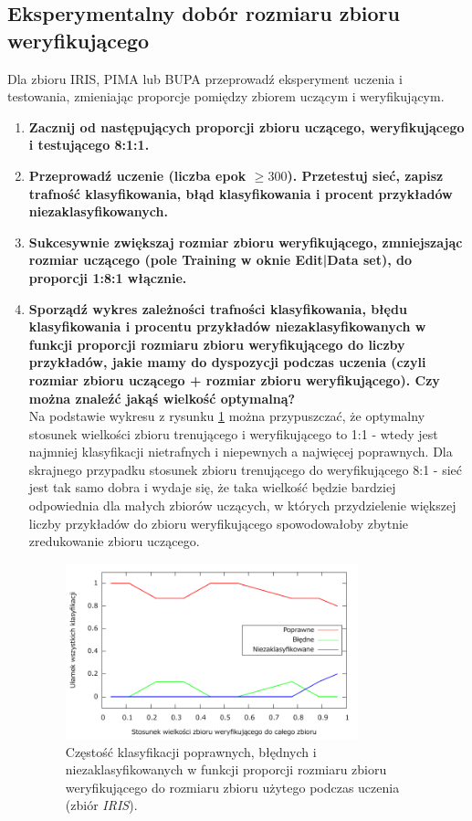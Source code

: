 \subsection{ Eksperymentalny dobór rozmiaru zbioru weryfikującego}
Dla zbioru IRIS, PIMA lub BUPA przeprowadź eksperyment uczenia i testowania, zmieniając proporcje pomiędzy zbiorem uczącym i weryfikującym.
\begin{enumerate}
\item \textbf{Zacznij od następujących proporcji zbioru uczącego, weryfikującego i testującego 8:1:1.}

\item \textbf{
Przeprowadź uczenie (liczba epok $ \geq 300 $). Przetestuj sieć, zapisz trafność klasyfikowania, błąd klasyfikowania i procent przykładów niezaklasyfikowanych.}

\item \textbf{
Sukcesywnie zwiększaj rozmiar zbioru weryfikującego, zmniejszając rozmiar uczącego (pole Training w oknie Edit|Data set), do proporcji 1:8:1 włącznie.}

\item \textbf{
Sporządź wykres zależności trafności klasyfikowania, błędu klasyfikowania i procentu przykładów niezaklasyfikowanych w funkcji proporcji rozmiaru zbioru weryfikującego do liczby przykładów, jakie mamy do dyspozycji podczas uczenia (czyli rozmiar zbioru uczącego + rozmiar zbioru weryfikującego). Czy można znaleźć jakąś wielkość optymalną?
}
\\Na podstawie wykresu z rysunku \ref{fig:verify} można przypuszczać, że optymalny stosunek wielkości zbioru trenującego i weryfikującego to 1:1 - wtedy jest najmniej klasyfikacji nietrafnych i niepewnych a najwięcej  poprawnych. Dla skrajnego przypadku stosunek zbioru trenującego do weryfikującego 8:1 - sieć jest tak samo   dobra i wydaje się, że taka wielkość będzie bardziej odpowiednia dla małych zbiorów uczących, w których    przydzielenie większej liczby przykładów do zbioru weryfikującego spowodowałoby zbytnie zredukowanie zbioru     uczącego.

\begin{figure}[h]
\centering
\includegraphics[width=0.8\textwidth]{dane/part1/zad9/verify}
\caption{Częstość klasyfikacji poprawnych, błędnych i niezaklasyfikowanych w funkcji proporcji rozmiaru zbioru weryfikującego do rozmiaru zbioru użytego podczas uczenia (zbiór \emph {IRIS}).\label{fig:verify}}
\end{figure}


\end{enumerate}

